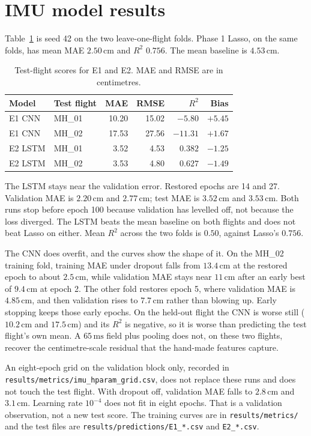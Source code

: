 \section{IMU model results}
Table~\ref{tab:imu} is seed 42 on the two leave-one-flight folds. Phase 1 Lasso, on the same folds, has mean MAE $2.50\,\mathrm{cm}$ and $R^2$ $0.756$. The mean baseline is $4.53\,\mathrm{cm}$.

\begin{table}[t]
\centering
\caption{Test-flight scores for E1 and E2. MAE and RMSE are in centimetres.}
\label{tab:imu}
\begin{tabular}{llrrrr}
\hline
Model & Test flight & MAE & RMSE & $R^2$ & Bias \\
\hline
E1 CNN & MH\_01 & 10.20 & 15.02 & $-5.80$ & $+5.45$ \\
E1 CNN & MH\_02 & 17.53 & 27.56 & $-11.31$ & $+1.67$ \\
E2 LSTM & MH\_01 & 3.52 & 4.53 & $0.382$ & $-1.25$ \\
E2 LSTM & MH\_02 & 3.53 & 4.80 & $0.627$ & $-1.49$ \\
\hline
\end{tabular}
\end{table}

The LSTM stays near the validation error. Restored epochs are 14 and 27. Validation MAE is $2.20\,\mathrm{cm}$ and $2.77\,\mathrm{cm}$; test MAE is $3.52\,\mathrm{cm}$ and $3.53\,\mathrm{cm}$. Both runs stop before epoch 100 because validation has levelled off, not because the loss diverged. The LSTM beats the mean baseline on both flights and does not beat Lasso on either. Mean $R^2$ across the two folds is $0.50$, against Lasso's $0.756$.

The CNN does overfit, and the curves show the shape of it. On the MH\_02 training fold, training MAE under dropout falls from $13.4\,\mathrm{cm}$ at the restored epoch to about $2.5\,\mathrm{cm}$, while validation MAE stays near $11\,\mathrm{cm}$ after an early best of $9.4\,\mathrm{cm}$ at epoch 2. The other fold restores epoch 5, where validation MAE is $4.85\,\mathrm{cm}$, and then validation rises to $7.7\,\mathrm{cm}$ rather than blowing up. Early stopping keeps those early epochs. On the held-out flight the CNN is worse still ($10.2\,\mathrm{cm}$ and $17.5\,\mathrm{cm}$) and its $R^2$ is negative, so it is worse than predicting the test flight's own mean. A $65\,\mathrm{ms}$ field plus pooling does not, on these two flights, recover the centimetre-scale residual that the hand-made features capture.

An eight-epoch grid on the validation block only, recorded in \texttt{results/metrics/imu\_hparam\_grid.csv}, does not replace these runs and does not touch the test flight. With dropout off, validation MAE falls to $2.8\,\mathrm{cm}$ and $3.1\,\mathrm{cm}$. Learning rate $10^{-4}$ does not fit in eight epochs. That is a validation observation, not a new test score. The training curves are in \texttt{results/metrics/} and the test files are \texttt{results/predictions/E1\_*.csv} and \texttt{E2\_*.csv}.
